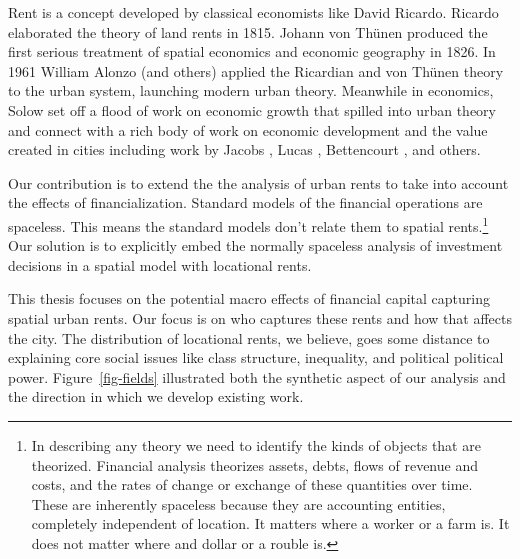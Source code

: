 
Rent is a concept developed by classical economists like David Ricardo. 
Ricardo \cite{ricardoEssayInfluenceLow1815} elaborated the theory of land rents in 1815. Johann von Th\"unen \cite{vonthunenIsolirteStaatBeziehung1826} %
produced the first serious treatment of spatial economics and economic geography %
in 1826. In 1961 William Alonzo (and others) \cite{alonsoModelUrbanLand1960} applied the Ricardian and von Th\"unen theory to the urban system, launching modern urban theory. Meanwhile in economics, Solow \cite{solowContributionTheoryEconomic1956} set off a flood of work on economic growth that spilled into urban theory and connect with a rich body of work on economic development and the value created in cities including work by Jacobs \cite{jacobsEconomyCities1969}, Lucas \cite{lucasMechanicsEconomicDevelopment1988}, Bettencourt  \cite{bettencourtGrowthInnovationScaling2007}, and others. 

Our contribution is to extend the the analysis of urban rents to take into account the effects of financialization. 
Standard models of the financial operations are spaceless. This means the standard models don't relate them to spatial rents.\footnote{In describing any theory we need to identify the kinds of objects that are theorized. Financial analysis theorizes  assets, debts, flows of revenue and costs, and the rates of change or exchange of these quantities over time. These are inherently spaceless because they are accounting entities, completely independent of location. It matters where a worker or a farm is. It does not matter where and dollar or a rouble is.} 
Our solution is to explicitly embed the normally spaceless analysis of investment decisions in a spatial model with locational rents. %

This thesis focuses on the potential macro effects of financial capital capturing spatial urban rents.  %
Our focus is on who captures these rents and how that affects the city. The distribution of locational rents, we believe, goes some distance to explaining core social issues like class structure, inequality, and political political power.  Figure~\ref{fig-fields} illustrated both the synthetic aspect of our analysis and the direction in which we develop existing work. %

